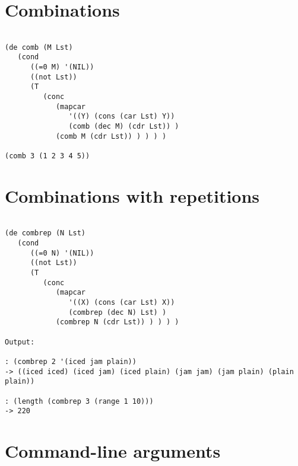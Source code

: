 \section*{Combinations}

\begin{verbatim}

(de comb (M Lst)
   (cond
      ((=0 M) '(NIL))
      ((not Lst))
      (T
         (conc
            (mapcar
               '((Y) (cons (car Lst) Y))
               (comb (dec M) (cdr Lst)) )
            (comb M (cdr Lst)) ) ) ) )

(comb 3 (1 2 3 4 5))

\end{verbatim}

\section*{Combinations with repetitions}

\begin{verbatim}

(de combrep (N Lst)
   (cond
      ((=0 N) '(NIL))
      ((not Lst))
      (T
         (conc
            (mapcar
               '((X) (cons (car Lst) X))
               (combrep (dec N) Lst) )
            (combrep N (cdr Lst)) ) ) ) )

Output:

: (combrep 2 '(iced jam plain))
-> ((iced iced) (iced jam) (iced plain) (jam jam) (jam plain) (plain plain))

: (length (combrep 3 (range 1 10)))
-> 220

\end{verbatim}

\section*{Command-line arguments}

